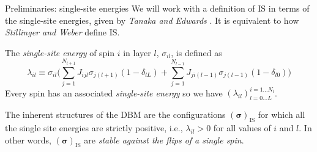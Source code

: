 \documentclass[8pt]{beamer}
\begin{document}
\begin{frame}[label={sec:org0361a7a}]{Preliminaries: single-site energies}
We will work with a definition of \(\mathrm{IS}\) in terms of the \alert{single-site energies}, given by \emph{Tanaka and Edwards} \cite{tanaka1980analytic}. It is equivalent to how \emph{Stillinger and Weber} define \(\mathrm{IS}\).
\linebreak
\begin{definition}
The \emph{single-site energy} of spin \(i\) in layer \(l\), \(\sigma_{il}\), is defined as
\[
\lambda_{i l} \equiv \sigma_{i l} \bigg( \sum_{j=1}^{N_{l+1}} J_{ijl} \sigma_{j (l+1)} (1 - \delta_{lL}) + \sum_{j=1}^{N_{l-1}} J_{ji(l-1)} \sigma_{j (l-1)} (1 - \delta_{l0}) \bigg) \tag{5}
\]
Every spin has an associated \emph{single-site energy} so we have \((\lambda_{il})_{l=0 \ldots L}^{i= 1 \ldots N_{l}}\).
\hfill \blacksquare
\label{orga258f92}
\end{definition}
\linebreak
\begin{definition}
The inherent structures of the DBM are the configurations \((\boldsymbol{\sigma})_{\text{IS}}\) for which all the single site energies are strictly positive, i.e., \(\lambda_{il} > 0\) for all values of \(i\) and \(l\). In other words, \((\boldsymbol{\sigma})_{\text {IS}}\) are \emph{stable against the flips of a single spin}.
\hfill \blacksquare
\label{org10c8d87}
\end{definition}
\end{frame}
\end{document}
